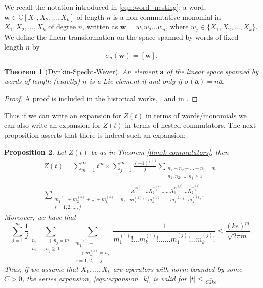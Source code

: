 \documentclass[11pt]{amsart}
\theoremstyle{plain}
\newtheorem{theorem}{Theorem}[section]
\newtheorem{proposition}[theorem]{Proposition}
\theoremstyle{remark}
\numberwithin{equation}{section}
\begin{document}
We recall the notation introduced in \eqref{eqn:word_nesting}:  a word, $\mathbf{w}\in\mathbb{C}[X_1,X_2,\ldots, X_k]$ of length $n$ is a non-commutative monomial in $X_1, X_2,\ldots, X_k$ of degree $n$, written as
$\mathbf{w}=w_1w_2\ldots w_n$, where $w_j\in\{X_1, X_2,\ldots, X_k\}$. 
We define the linear transformation on the space spanned by words of fixed length $n$ by
\begin{equation}\label{eqn:linear_map_words}
\sigma_n(\mathbf{w})=[\mathbf{w}].
\end{equation}
\begin{theorem}[Dynkin-Specht-Wever]\label{thm:DSW}
An element $\mathbf{a}$ of the linear space spanned by words of length (exactly) $n$ is a Lie element if and only if 
$\sigma(\mathbf{a})=n \mathbf{a}.$
\end{theorem}
\begin{proof}
A proof is included in the historical works, \cite{Dyn, Spe, Wev}, and in \cite{BonFul12}. 
\end{proof}
Thus if we can write an expansion for $Z(t)$ in terms of words/monomials we can also write an expansion for $Z(t)$ in terms of nested commutators. The next proposition asserts that there is indeed such an expansion:
\begin{proposition}\label{prop:k_expansion}
Let $Z(t)$ be as in Theorem \ref{thm:k-commutators}, then
\begin{multline}\label{eqn:expansion_k}
Z(t)
=\sum_{m=1}^{\infty}t^m \times
%
\sum_{j=1}^{m}\frac{(-1)^{j+1}}{j}
\sum_{
\substack{
n_1+n_2+\ldots +n_j=m
\\n_1,n_2,\ldots,n_j\geq 1
}}
\\
\sum_{
\substack{
m_1^{(s)}+m_2^{(s)}+\ldots +m_k^{(s)}=n_s
\\
s=1,2,\ldots, j 
}
}
\frac{X_1^{m_1^{(1)}}\ldots
X_k^{m_k^{(1)}}
\ldots 
\ldots
X_1^{m_1^{(j)}} 
\ldots 
X_k^{m_k^{(j)}}}{m_1^{(1)}! \ldots m_k^{(1)}!
\ldots \ldots
m_1^{(j)}! \ldots m_k^{(j)}!}.
\end{multline}
Moreover, we have that
\begin{equation}
\sum_{j=1}^{m}\frac{1}{j}
\sum_{
\substack{
n_1+\ldots +n_j=m
\\n_1,\ldots,n_j\geq 1
}}
\sum_{
\substack{
m_1^{(s)}+
\\\ldots +m_k^{(s)}=n_s
\\
s=1,2,\ldots, j 
}
}
\frac{1}{m_1^{(1)}! \ldots m_k^{(1)}!\ldots \ldots m_1^{(j)}! \ldots m_k^{(j)}!}\leq \frac{(ke)^m}{\sqrt{2\pi m}}.
\end{equation}
Thus, if we assume that $X_1,\ldots, X_k$ are operators with norm bounded by some $C>0$,
the series expansion, \eqref{eqn:expansion_k}, is valid for $|t|\leq \frac{1}{C2ke}$.
\end{proposition}
\end{document}
